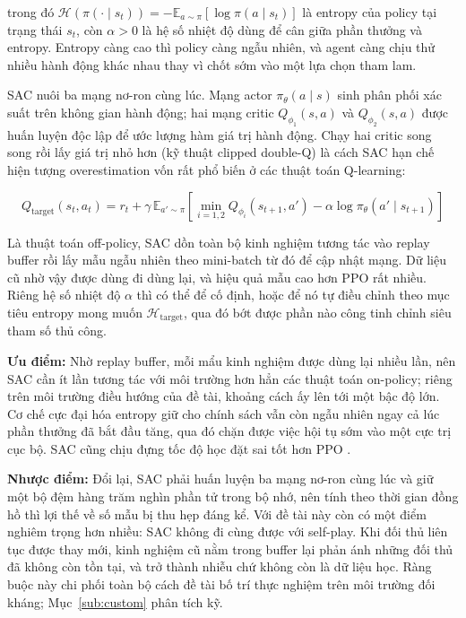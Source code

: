 \noindent trong đó $\mathcal{H}(\pi(\cdot \mid s_t)) = -\mathbb{E}_{a \sim \pi}
[\log \pi(a \mid s_t)]$ là entropy của policy tại trạng thái $s_t$, còn $\alpha > 0$ là hệ
số nhiệt độ dùng để cân giữa phần thưởng và entropy. Entropy càng cao thì
policy càng ngẫu nhiên, và agent càng chịu thử nhiều hành động khác nhau thay vì chốt sớm
vào một lựa chọn tham lam.

\indent SAC nuôi ba mạng nơ-ron cùng lúc. Mạng actor $\pi_\theta(a \mid s)$ sinh phân phối
xác suất trên không gian hành động; hai mạng critic $Q_{\phi_1}(s,a)$ và $Q_{\phi_2}(s,a)$
được huấn luyện độc lập để ước lượng hàm giá trị hành động. Chạy hai critic song song rồi
lấy giá trị nhỏ hơn (kỹ thuật clipped double-Q) là cách SAC hạn chế hiện tượng
overestimation vốn rất phổ biến ở các thuật toán Q-learning:

\begin{equation}
    Q_\text{target}(s_t, a_t) = r_t + \gamma \,
    \mathbb{E}_{a' \sim \pi} \!\left[
        \min_{i=1,2} Q_{\phi_i}(s_{t+1}, a') -
        \alpha \log \pi_\theta(a' \mid s_{t+1})
    \right]
\end{equation}

\indent Là thuật toán off-policy, SAC dồn toàn bộ kinh nghiệm tương tác vào replay buffer
rồi lấy mẫu ngẫu nhiên theo mini-batch từ đó để cập nhật mạng. Dữ liệu cũ nhờ vậy được
dùng đi dùng lại, và hiệu quả mẫu cao hơn PPO rất nhiều. Riêng hệ số nhiệt độ $\alpha$ thì
có thể để cố định, hoặc để nó tự điều chỉnh theo mục tiêu entropy mong muốn
$\mathcal{H}_\text{target}$, qua đó bớt được phần nào công tinh chỉnh siêu tham số thủ
công.

\indent \textbf{Ưu điểm:} Nhờ replay buffer, mỗi mẩu kinh nghiệm được dùng lại nhiều lần,
nên SAC cần ít lần tương tác với môi trường hơn hẳn các thuật toán on-policy; riêng trên
môi trường điều hướng của đề tài, khoảng cách ấy lên tới một bậc độ lớn. Cơ chế cực đại
hóa entropy giữ cho chính sách vẫn còn ngẫu nhiên ngay cả lúc phần thưởng đã bắt đầu tăng,
qua đó chặn được việc hội tụ sớm vào một cực trị cục bộ. SAC cũng chịu đựng tốc độ học đặt
sai tốt hơn PPO \cite{haarnoja2018softapps}.

\indent \textbf{Nhược điểm:} Đổi lại, SAC phải huấn luyện ba mạng nơ-ron cùng lúc và giữ
một bộ đệm hàng trăm nghìn phần tử trong bộ nhớ, nên tính theo thời gian đồng hồ thì lợi
thế về số mẫu bị thu hẹp đáng kể. Với đề tài này còn có một điểm nghiêm trọng hơn nhiều:
SAC không đi cùng được với self-play. Khi đối thủ liên tục được thay mới, kinh nghiệm cũ
nằm trong buffer lại phản ánh những đối thủ đã không còn tồn tại, và trở thành nhiễu chứ
không còn là dữ liệu học. Ràng buộc này chi phối toàn bộ cách đề tài bố trí thực nghiệm
trên môi trường đối kháng; Mục~\ref{sub:custom} phân tích kỹ.

